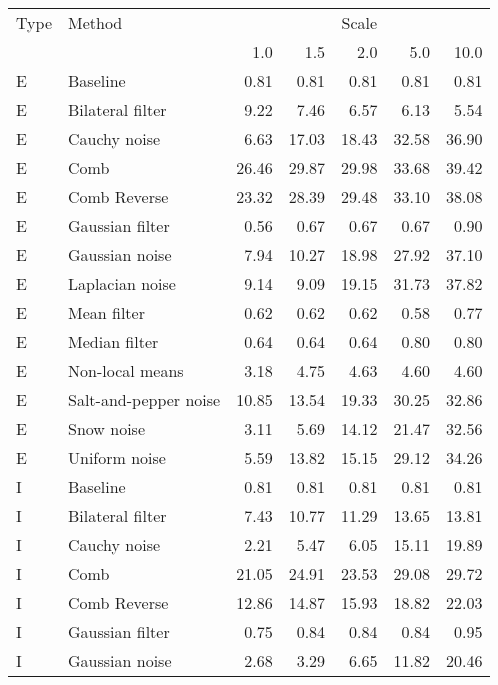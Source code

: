 \begin{tabular}{llrrrrr}
\toprule
Type &     Method             & \multicolumn{5}{c}{Scale} \\
& &   1.0 &   1.5 &   2.0 &   5.0 &  10.0 \\
\midrule
E    &               Baseline &  0.81 &  0.81 &  0.81 &  0.81 &  0.81 \\
E    &       Bilateral filter &  9.22 &  7.46 &  6.57 &  6.13 &  5.54 \\
E    &           Cauchy noise &  6.63 & 17.03 & 18.43 & 32.58 & 36.90 \\
E    &                   Comb & 26.46 & 29.87 & 29.98 & 33.68 & 39.42 \\
E    &           Comb Reverse & 23.32 & 28.39 & 29.48 & 33.10 & 38.08 \\
E    &        Gaussian filter &  0.56 &  0.67 &  0.67 &  0.67 &  0.90 \\
E    &         Gaussian noise &  7.94 & 10.27 & 18.98 & 27.92 & 37.10 \\
E    &        Laplacian noise &  9.14 &  9.09 & 19.15 & 31.73 & 37.82 \\
E    &            Mean filter &  0.62 &  0.62 &  0.62 &  0.58 &  0.77 \\
E    &          Median filter &  0.64 &  0.64 &  0.64 &  0.80 &  0.80 \\
E    &        Non-local means &  3.18 &  4.75 &  4.63 &  4.60 &  4.60 \\
E    &  Salt-and-pepper noise & 10.85 & 13.54 & 19.33 & 30.25 & 32.86 \\
E    &             Snow noise &  3.11 &  5.69 & 14.12 & 21.47 & 32.56 \\
E    &          Uniform noise &  5.59 & 13.82 & 15.15 & 29.12 & 34.26 \\
I    &               Baseline &  0.81 &  0.81 &  0.81 &  0.81 &  0.81 \\
I    &       Bilateral filter &  7.43 & 10.77 & 11.29 & 13.65 & 13.81 \\
I    &           Cauchy noise &  2.21 &  5.47 &  6.05 & 15.11 & 19.89 \\
I    &                   Comb & 21.05 & 24.91 & 23.53 & 29.08 & 29.72 \\
I    &           Comb Reverse & 12.86 & 14.87 & 15.93 & 18.82 & 22.03 \\
I    &        Gaussian filter &  0.75 &  0.84 &  0.84 &  0.84 &  0.95 \\
I    &         Gaussian noise &  2.68 &  3.29 &  6.65 & 11.82 & 20.46 \\

\end{tabular}
